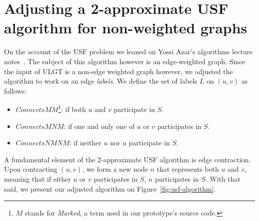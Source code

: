 \documentclass{article}
\begin{document}
\section{Adjusting a 2-approximate USF algorithm for non-weighted graphs}
\label{sec:usf}

On the account of the USF problem we leaned on Yossi Azar's algorithms lecture notes~\cite{usf}. The subject of this algorithm however is an edge-weighted graph. Since the input of ULGT is a non-edge weighted graph however, we adjusted the algorithm to work on an edge \textit{labels}. We define the set of labels $L$ on $(u,v)$ as follows:
\begin{itemize}
  \item $ConnectsMM$\footnote{$M$ stands for \textit{Marked}, a term used in our prototype's source code.}: if both $u$ and $v$ participate in $S$.
  \item $ConnectsMNM$: if one and only one of $u$ or $v$ participates in $S$.
  \item $ConnectsNMNM$: if neither $u$ nor $u$ participate in $S$.
\end{itemize}

A fundamental element of the 2-approximate USF algorithm is edge contraction. Upon contracting $(u,v)$, we form a new node $n$ that represents both $u$ and $v$, meaning that if either $u$ or $v$ participates in $S$, $n$ participates in $S$. With that said, we present our adjusted algorithm on Figure~\ref{fig:usf-algorithm}.
\end{document}

